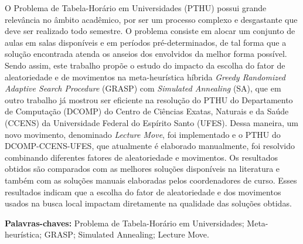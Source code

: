 \documentclass[
	12pt,				%
	openright,			%
	oneside,			%
	a4paper,			%
	english,			%
	french,				%
	spanish,			%
	brazil				%
	]{abntex2}
\begin{document}


\setlength{\absparsep}{18pt}
\begin{resumo}
O Problema de Tabela-Horário em Universidades (PTHU) possui grande relevância no âmbito acadêmico, por ser um processo complexo e desgastante que deve ser realizado todo semestre. O problema consiste em alocar um conjunto de aulas em salas disponíveis e em períodos pré-determinados, de tal forma que a solução encontrada atenda os anseios dos envolvidos da melhor forma possível. Sendo assim, este trabalho propõe o estudo do impacto da escolha do fator de aleatoriedade e de movimentos na meta-heurística híbrida \textit{Greedy Randomized Adaptive Search Procedure} (GRASP) com \textit{Simulated Annealing} (SA), que em outro trabalho já mostrou ser eficiente na resolução do PTHU do Departamento de Computação (DCOMP) do Centro de Ciências Exatas, Naturais e da Saúde (CCENS) da Universidade Federal do Espírito Santo (UFES). Dessa maneira, um novo movimento, denominado \textit{Lecture Move}, foi implementado e o PTHU do DCOMP-CCENS-UFES, que atualmente é elaborado manualmente, foi resolvido combinando diferentes fatores de aleatoriedade e movimentos. Os resultados obtidos são comparados com as melhores soluções disponíveis na literatura e também com as soluções manuais elaboradas pelos coordenadores de curso. Esses resultados indicam que a escolha do fator de aleatoriedade e dos movimentos usados na busca local impactam diretamente na qualidade das soluções obtidas.

\textbf{Palavras-chaves:} Problema de Tabela-Horário em Universidades; Meta-heurística; GRASP; Simulated Annealing; Lecture Move.

\end{resumo}
\end{document}
